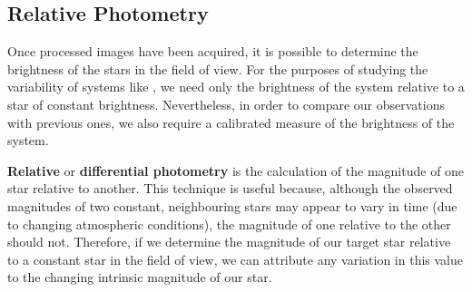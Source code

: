 
\subsection{Relative Photometry}\label{cha:InfraredDataReductionTechniques:sec:Photometry:subsec:RelativePhotometry}

Once processed images have been acquired, it is possible to determine
the brightness of the stars in the field of view. For
the purposes of studying the variability of systems like \groj,
we need only the brightness of the system relative to a star of
constant brightness. Nevertheless, in order to compare our
observations with previous ones, we also require a calibrated measure
of the brightness of the system. %

\vspace{\myparskip}

\textbf{Relative} or \textbf{differential photometry} %
is the calculation of the magnitude of one star relative to
another. This technique is useful because, although the observed magnitudes of
two constant, neighbouring stars may appear to vary in time (due to
changing atmospheric conditions), the magnitude of one relative to the
other should not. Therefore, if we determine the magnitude of our
target star relative to a constant star in the field of view, we can
attribute any variation in this value to the changing intrinsic magnitude of our star. %

\vspace{\myparskip}

